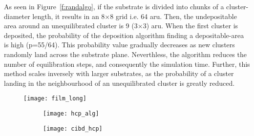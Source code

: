 As seen in Figure~\ref{f:randalgo}, if the substrate is divided into chunks of a cluster-diameter length, it results in an 8$\times$8 grid i.e. 64 \gls{aru}. Then, the undepositable area around an unequilibrated cluster is 9 (3$\times$3) \gls{aru}. When the first cluster is deposited, the probability of the deposition algorithm finding a depositable-area is high (p=55/64). This probability value gradually decreases as new clusters randomly land across the substrate plane. Neverthless, the algorithm reduces the number of equilibration steps, and consequently the simulation time. Further, this method scales inversely with larger substrates, as the probability of a cluster landing in the neighbourhood of an unequilibrated cluster is greatly reduced. \par

\begin{changebar}
\begin{figure}[!h]
	\centering
	\texttt{[image: film\_long]}
	\label{f:random_multi}
\end{figure}

	\begin{figure}[!h] 
		\centering
		\begin{subfigure}{0.5\textwidth} \centering
			\texttt{[image: hcp\_alg]}
			\subcaption{}
			\label{f:hcp_dep_algo}
		\end{subfigure}%
		\hfill
		\begin{subfigure}{0.5\textwidth} \centering
			\texttt{[image: cibd\_hcp]}
			\subcaption{}
			\label{f:hcp_top}
		\end{subfigure}
		\label{f:hcpalgo}
	\end{figure}


\end{changebar}
